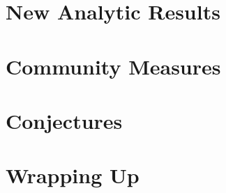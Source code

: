 \documentclass{beamer}
\begin{document}
\section{New Analytic Results}
		
		\begin{frame}\frametitle{}
		  
		\end{frame}

\section{Community Measures}
		
		\begin{frame}\frametitle{}
		  
		\end{frame}

\section{Conjectures}
		
		\begin{frame}\frametitle{}
		  
		\end{frame}

\section{Wrapping Up}
		
		\begin{frame}\frametitle{}
		  
		\end{frame}

	
\end{document}
